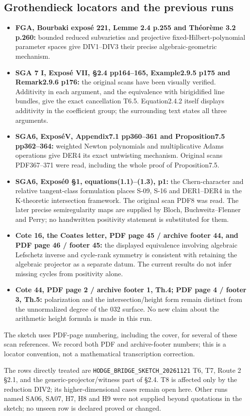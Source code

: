 \documentclass[11pt,a4paper]{article}
\providecommand{\tightlist}{\setlength{\itemsep}{0pt}\setlength{\parskip}{0pt}}
\theoremstyle{definition}
\begin{document}
\subsection{Grothendieck locators and the previous
runs}\label{grothendieck-locators-and-the-previous-runs}

\begin{itemize}
\tightlist
\item
  \textbf{FGA, Bourbaki exposé 221, Lemme 2.4 p.255 and Théorème 3.2
  p.260:} bounded reduced subvarieties and projective
  fixed-Hilbert-polynomial parameter spaces give DIV1--DIV3 their
  precise algebraic-geometric mechanism.
\item
  \textbf{SGA 7 I, Exposé VII, §2.4 pp164--165, Example2.9.5 p175 and
  Remark2.9.6 p176:} the original scans have been visually verified.
  Additivity in each argument, and the equivalence with birigidified
  line bundles, give the exact cancellation T6.5. Equation2.4.2 itself
  displays additivity in the coefficient group; the surrounding text
  states all three arguments.
\item
  \textbf{SGA6, ExposéV, Appendix7.1 pp360--361 and Proposition7.5
  pp362--364:} weighted Newton polynomials and multiplicative Adams
  operations give DER4 its exact untwisting mechanism. Original scans
  PDF367--371 were read, including the whole proof of Proposition7.5.
\item
  \textbf{SGA6, Exposé0 §1, equations(1.1)--(1.3), p1:} the
  Chern-character and relative tangent-class formulation places S-09,
  S-16 and DER1--DER4 in the K-theoretic intersection framework. The
  original scan PDF8 was read. The later precise semiregularity maps are
  supplied by Bloch, Buchweitz--Flenner and Perry; no handwritten
  positivity statement is substituted for them.
\item
  \textbf{Cote 16, the Coates letter, PDF page 45 / archive footer 44,
  and PDF page 46 / footer 45:} the displayed equivalence involving
  algebraic Lefschetz inverse and cycle-rank symmetry is consistent with
  retaining the algebraic projector as a separate datum. The current
  results do not infer missing cycles from positivity alone.
\item
  \textbf{Cote 44, PDF page 2 / archive footer 1, Th.4; PDF page 4 /
  footer 3, Th.5:} polarization and the intersection/height form remain
  distinct from the unnormalized degree of the 032 surface. No new claim
  about the arithmetic height formula is made in this run.
\end{itemize}

The sketch uses PDF-page numbering, including the cover, for several of
these scan references. We record both PDF and archive-footer numbers;
this is a locator convention, not a mathematical transcription
correction.

The rows directly treated are \texttt{HODGE\_BRIDGE\_SKETCH\_20261121}
T6, T7, Route 2 §2.1, and the generic-projector/witness part of §2.4. T8
is affected only by the reduction DIV2; its higher-dimensional cases
remain open here. Other runs named SA06, SA07, H7, H8 and H9 were not
supplied beyond quotations in the sketch; no unseen row is declared
proved or changed.
\end{document}
